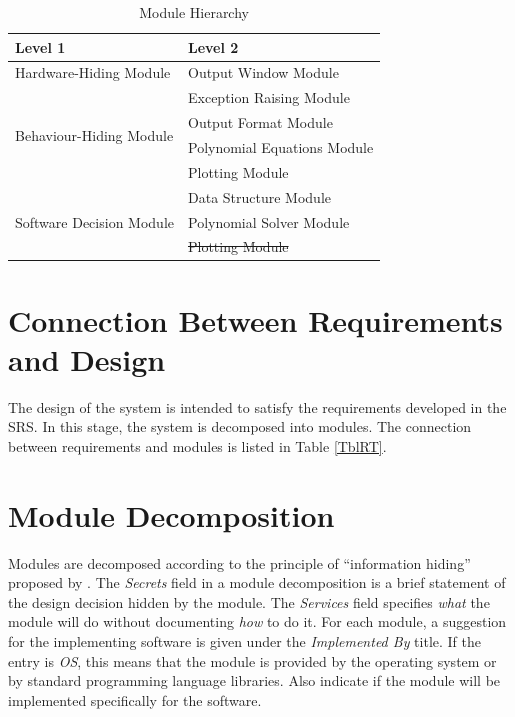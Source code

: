 \documentclass[12pt, titlepage]{article}
\begin{document}
\begin{table}[h!]
\centering
\begin{tabular}{p{} p{}}
\toprule
\textbf{Level 1} & \textbf{Level 2}\\
\midrule

{Hardware-Hiding Module} 
& Output Window Module \\
\midrule

\multirow{4}{0.3\textwidth}{Behaviour-Hiding Module} 
& Exception Raising Module\\
& Output Format Module\\
& Polynomial Equations Module\\
& Plotting Module \\
\midrule

\multirow{3}{0.3\textwidth}{Software Decision Module} & 
Data Structure Module\\
& Polynomial Solver Module\\
&\st{Plotting Module} \\
\bottomrule

\end{tabular}
\caption{Module Hierarchy}
\label{TblMH}
\end{table}

\section{Connection Between Requirements and Design} \label{SecConnection}

The design of the system is intended to satisfy the requirements developed in
the SRS. In this stage, the system is decomposed into modules. The connection
between requirements and modules is listed in Table \ref{TblRT}.

\section{Module Decomposition} \label{SecMD}

Modules are decomposed according to the principle of ``information hiding''
proposed by \citet{ParnasEtAl1984}. The \emph{Secrets} field in a module
decomposition is a brief statement of the design decision hidden by the
module. The \emph{Services} field specifies \emph{what} the module will do
without documenting \emph{how} to do it. For each module, a suggestion for the
implementing software is given under the \emph{Implemented By} title. If the
entry is \emph{OS}, this means that the module is provided by the operating
system or by standard programming language libraries.  Also indicate if the
module will be implemented specifically for the software.
\end{document}

